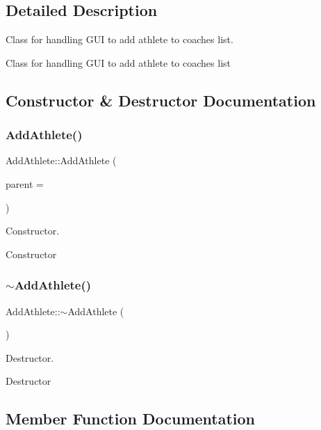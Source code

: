 \subsection{Detailed Description}
Class for handling G\+UI to add athlete to coaches list. 

Class for handling G\+UI to add athlete to coaches list 

\subsection{Constructor \& Destructor Documentation}
\mbox{\label{classAddAthlete_a921edacf81e6d501ad54a5de57c85f96}} 
\subsubsection{\texorpdfstring{AddAthlete()}{AddAthlete()}}
{\footnotesize\ttfamily Add\+Athlete\+::\+Add\+Athlete (\begin{DoxyParamCaption}\item[{Q\+Widget $\ast$}]{parent = {} }\end{DoxyParamCaption})\hspace{0.3cm}{\ttfamily [explicit]}}



Constructor. 

Constructor \mbox{\label{classAddAthlete_a07c7ce08c0962c8c03d0a30b654f4b14}} 
\subsubsection{\texorpdfstring{$\sim$AddAthlete()}{~AddAthlete()}}
{\footnotesize\ttfamily Add\+Athlete\+::$\sim$\+Add\+Athlete (\begin{DoxyParamCaption}{ }\end{DoxyParamCaption})}



Destructor. 

Destructor 

\subsection{Member Function Documentation}
\mbox{\label{classAddAthlete_a715b92425445010d44ffcf982257aed9}} 
